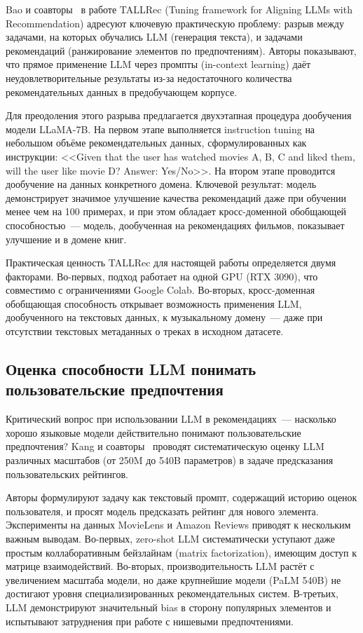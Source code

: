 Bao и соавторы~\cite{bao2023tallrec} в работе TALLRec (Tuning framework for Aligning LLMs with Recommendation) адресуют ключевую практическую проблему: разрыв между задачами, на которых обучались LLM (генерация текста), и задачами рекомендаций (ранжирование элементов по предпочтениям). Авторы показывают, что прямое применение LLM через промпты (in-context learning) даёт неудовлетворительные результаты из-за недостаточного количества рекомендательных данных в предобучающем корпусе.

Для преодоления этого разрыва предлагается двухэтапная процедура дообучения модели LLaMA-7B. На первом этапе выполняется instruction tuning на небольшом объёме рекомендательных данных, сформулированных как инструкции: <<Given that the user has watched movies A, B, C and liked them, will the user like movie D? Answer: Yes/No>>. На втором этапе проводится дообучение на данных конкретного домена. Ключевой результат: модель демонстрирует значимое улучшение качества рекомендаций даже при обучении менее чем на 100 примерах, и при этом обладает кросс-доменной обобщающей способностью~--- модель, дообученная на рекомендациях фильмов, показывает улучшение и в домене книг.

Практическая ценность TALLRec для настоящей работы определяется двумя факторами. Во-первых, подход работает на одной GPU (RTX 3090), что совместимо с ограничениями Google Colab. Во-вторых, кросс-доменная обобщающая способность открывает возможность применения LLM, дообученного на текстовых данных, к музыкальному домену~--- даже при отсутствии текстовых метаданных о треках в исходном датасете.

\subsection{Оценка способности LLM понимать пользовательские предпочтения}

Критический вопрос при использовании LLM в рекомендациях~--- насколько хорошо языковые модели действительно понимают пользовательские предпочтения? Kang и соавторы~\cite{kang2024llm_preferences} проводят систематическую оценку LLM различных масштабов (от 250M до 540B параметров) в задаче предсказания пользовательских рейтингов.

Авторы формулируют задачу как текстовый промпт, содержащий историю оценок пользователя, и просят модель предсказать рейтинг для нового элемента. Эксперименты на данных MovieLens и Amazon Reviews приводят к нескольким важным выводам. Во-первых, zero-shot LLM систематически уступают даже простым коллаборативным бейзлайнам (matrix factorization), имеющим доступ к матрице взаимодействий. Во-вторых, производительность LLM растёт с увеличением масштаба модели, но даже крупнейшие модели (PaLM 540B) не достигают уровня специализированных рекомендательных систем. В-третьих, LLM демонстрируют значительный bias в сторону популярных элементов и испытывают затруднения при работе с нишевыми предпочтениями.

